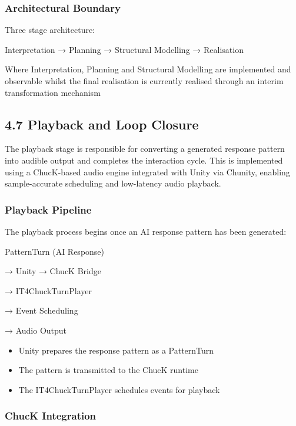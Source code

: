 \subsubsection{Architectural Boundary}\label{architectural-boundary}

Three stage architecture:

Interpretation → Planning → Structural Modelling → Realisation

Where Interpretation, Planning and Structural Modelling are implemented
and observable whilst the final realisation is currently realised
through an interim transformation mechanism

\subsection{4.7 Playback and Loop
Closure}\label{playback-and-loop-closure}

The playback stage is responsible for converting a generated response
pattern into audible output and completes the interaction cycle. This is
implemented using a ChucK-based audio engine integrated with Unity via
Chunity, enabling sample-accurate scheduling and low-latency audio
playback.

\subsubsection{Playback Pipeline}\label{playback-pipeline}

The playback process begins once an AI response pattern has been
generated:

PatternTurn (AI Response)

→ Unity → ChucK Bridge

→ IT4ChuckTurnPlayer

→ Event Scheduling

→ Audio Output

\begin{itemize}
\item
  Unity prepares the response pattern as a PatternTurn
\item
  The pattern is transmitted to the ChucK runtime
\item
  The IT4ChuckTurnPlayer schedules events for playback
\end{itemize}

\subsubsection{ChucK Integration}\label{chuck-integration}

